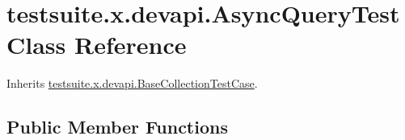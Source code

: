 \hypertarget{classtestsuite_1_1x_1_1devapi_1_1_async_query_test}{}\section{testsuite.\+x.\+devapi.\+Async\+Query\+Test Class Reference}
\label{classtestsuite_1_1x_1_1devapi_1_1_async_query_test}


Inherits \mbox{\hyperlink{classtestsuite_1_1x_1_1devapi_1_1_base_collection_test_case}{testsuite.\+x.\+devapi.\+Base\+Collection\+Test\+Case}}.

\subsection*{Public Member Functions}
